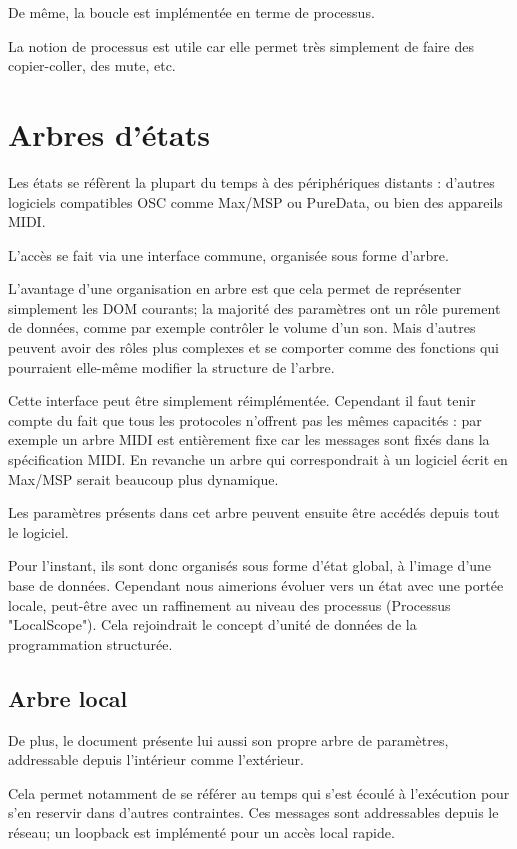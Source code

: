 \documentclass{sigchi}
\begin{document}
De même, la boucle est implémentée en terme de processus.

La notion de processus est utile car elle permet très simplement de faire des copier-coller, des mute, etc.

\section{Arbres d'états}
Les états se réfèrent la plupart du temps à des périphériques distants : d'autres logiciels compatibles OSC comme Max/MSP ou PureData, ou bien des appareils MIDI.

L'accès se fait via une interface commune, organisée sous forme d'arbre.




L'avantage d'une organisation en arbre est que cela permet de représenter simplement les DOM courants; la majorité des paramètres ont un rôle purement de données, comme par exemple contrôler le volume d'un son. Mais d'autres peuvent avoir des rôles plus complexes et se comporter comme des fonctions qui pourraient elle-même modifier la structure de l'arbre.


Cette interface peut être simplement réimplémentée. Cependant il faut tenir compte du fait que tous les protocoles n'offrent pas les mêmes capacités : par exemple un arbre MIDI est entièrement fixe car les messages sont fixés dans la spécification MIDI. En revanche un arbre qui correspondrait à un logiciel écrit en Max/MSP serait beaucoup plus dynamique.

Les paramètres présents dans cet arbre peuvent ensuite être accédés depuis tout le logiciel.

Pour l'instant, ils sont donc organisés sous forme d'état global, à l'image d'une base de données. Cependant nous aimerions évoluer vers un état avec une portée locale, peut-être avec un raffinement au niveau des processus (Processus "LocalScope"). Cela rejoindrait le concept d'unité de données de la programmation structurée.

\subsection{Arbre local}
De plus, le document présente lui aussi son propre arbre de paramètres, addressable depuis l'intérieur comme l'extérieur.

Cela permet notamment de se référer au temps qui s'est écoulé à l'exécution pour s'en reservir dans d'autres contraintes. Ces messages sont addressables depuis le réseau; un loopback est implémenté pour un accès local rapide.
\end{document}

